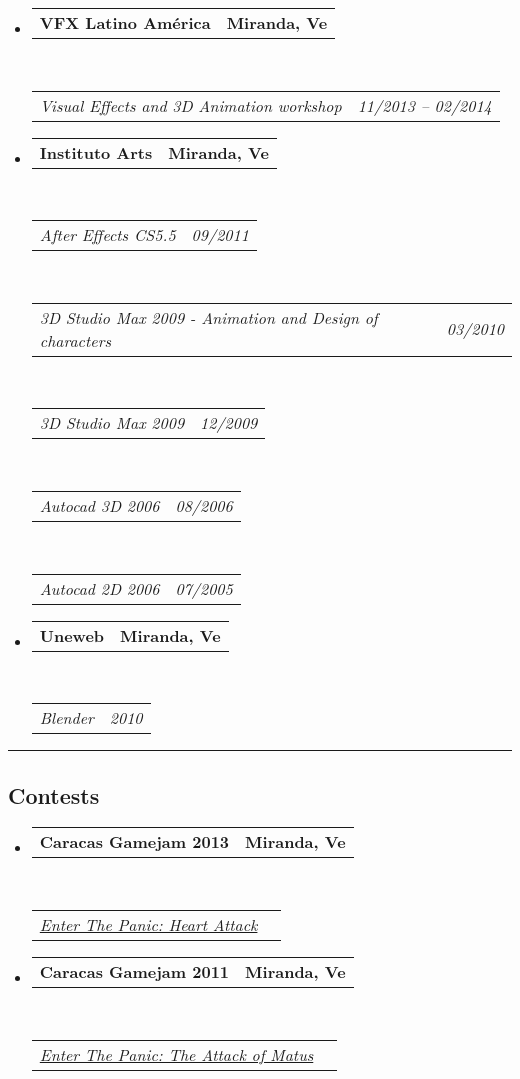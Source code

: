 \documentclass[10pt,letterpaper]{article}
\makeatletter
\newcommand{\headerrow}[2]
{\begin{tabular*}{\linewidth}{l@{\extracolsep{\fill}}r}
	#1 &
	#2 \\
\end{tabular*}}
\makeatother
\begin{document}
\begin{itemize}
	\parskip=0.1em

\item 
   \headerrow
   {\textbf{VFX Latino América}}
   {\textbf{Miranda, Ve}}
  \\
  \headerrow
   {\emph{Visual Effects and 3D Animation workshop}}
   {\emph{11/2013 -- 02/2014}}

\item 
   \headerrow
   {\textbf{Instituto Arts}}
   {\textbf{Miranda, Ve}}
	\\
	\headerrow
   {\emph{After Effects CS5.5}}
   {\emph{09/2011}}
	\\
	\headerrow
   {\emph{3D Studio Max 2009 - Animation and Design of characters}}
   {\emph{03/2010}}
	\\
	\headerrow
   {\emph{3D Studio Max 2009}}
   {\emph{12/2009}}
	\\
	\headerrow
   {\emph{Autocad 3D 2006 }}
   {\emph{08/2006}}
	\\
	\headerrow
   {\emph{Autocad 2D 2006}}
   {\emph{07/2005}}

\item 
   \headerrow
   {\textbf{Uneweb}}
   {\textbf{Miranda, Ve}}
	\\
	\headerrow
   {\emph{Blender}}
   {\emph{2010}}
\end{itemize}



\hrule
\vspace{-0.4em}
\subsection*{Contests}

\begin{itemize}
	\parskip=0.1em
\item 
   \headerrow
   {\textbf{Caracas Gamejam 2013}}
   {\textbf{Miranda, Ve}}
	\\
	\headerrow
   {\emph{\href{http://globalgamejam.org/2013/enter-panic-heart-attack}{Enter The Panic: Heart Attack}}}{}
\item 
   \headerrow
   {\textbf{Caracas Gamejam 2011}}
   {\textbf{Miranda, Ve}}
	\\
	\headerrow
   {\emph{\href{http://archive.globalgamejam.org/2011/enter-panic-attack-matus}{Enter The Panic: The Attack of Matus}}}{}
\end{itemize}
\end{document}
